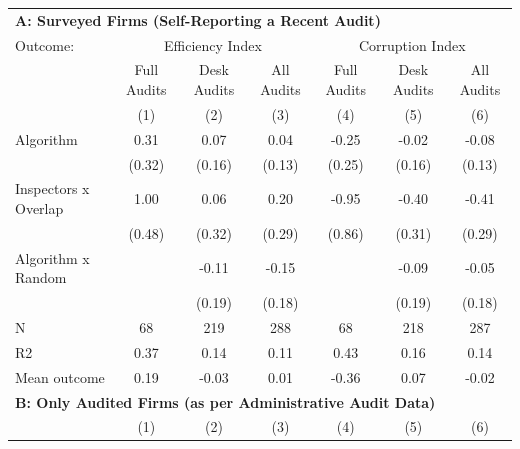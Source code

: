 \begin{tabular}{lccc|ccc} \toprule
\multicolumn{7}{l}{\textbf{A: Surveyed Firms (Self-Reporting a Recent Audit)}} \\ \multicolumn{1}{l}{Outcome:} & \multicolumn{3}{c}{Efficiency Index} & \multicolumn{3}{c}{Corruption Index} \\ \multicolumn{1}{l}{} & Full Audits & Desk Audits & All Audits & Full Audits & Desk Audits & All Audits \\ \multicolumn{1}{l}{} & (1) & (2) & (3) & (4) & (5) & (6) \\ \midrule
Algorithm   &        0.31         &        0.07         &        0.04         &       -0.25         &       -0.02         &       -0.08         \\
            &      (0.32)         &      (0.16)         &      (0.13)         &      (0.25)         &      (0.16)         &      (0.13)         \\
\addlinespace
Inspectors x Overlap&        1.00\sym{**} &        0.06         &        0.20         &       -0.95         &       -0.40         &       -0.41         \\
            &      (0.48)         &      (0.32)         &      (0.29)         &      (0.86)         &      (0.31)         &      (0.29)         \\
\addlinespace
Algorithm x Random&                     &       -0.11         &       -0.15         &                     &       -0.09         &       -0.05         \\
            &                     &      (0.19)         &      (0.18)         &                     &      (0.19)         &      (0.18)         \\
\midrule
N           &          68         &         219         &         288         &          68         &         218         &         287         \\
R2          &        0.37         &        0.14         &        0.11         &        0.43         &        0.16         &        0.14         \\
Mean outcome&        0.19         &       -0.03         &        0.01         &       -0.36         &        0.07         &       -0.02         \\

\midrule \multicolumn{7}{l}{\textbf{B: Only Audited Firms (as per Administrative Audit Data)}} \\ \multicolumn{1}{l}{} & (1) & (2) & (3) & (4) & (5) & (6) \\ \midrule


\end{tabular}

